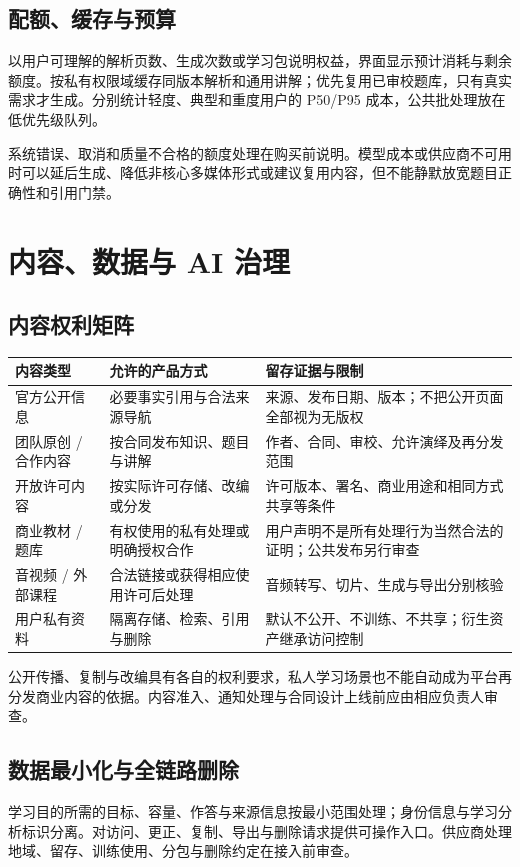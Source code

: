 \documentclass[UTF8,a4paper,11pt,fontset=none]{ctexart}
\newcommand{\cth}[1]{\textbf{\sffamily #1}}
\newcommand{\newsec}[1]{\clearpage\section{#1}}
\newenvironment{tbl}{\par\vspace{3pt}\small\noindent\ignorespaces}{\unskip\par\vspace{5pt}}
\begin{document}
\subsection{配额、缓存与预算}
以用户可理解的解析页数、生成次数或学习包说明权益，界面显示预计消耗与剩余额度。按私有权限域缓存同版本解析和通用讲解；优先复用已审校题库，只有真实需求才生成。分别统计轻度、典型和重度用户的 P50/P95 成本，公共批处理放在低优先级队列。

系统错误、取消和质量不合格的额度处理在购买前说明。模型成本或供应商不可用时可以延后生成、降低非核心多媒体形式或建议复用内容，但不能静默放宽题目正确性和引用门禁。

\newsec{内容、数据与 AI 治理}
\subsection{内容权利矩阵}
\begin{tbl}
\begin{tabularx}{\linewidth}{@{}L{29mm}YY@{}}
\toprule
\cth{内容类型}&\cth{允许的产品方式}&\cth{留存证据与限制}\\\midrule
官方公开信息&必要事实引用与合法来源导航&来源、发布日期、版本；不把公开页面全部视为无版权\\
团队原创 / 合作内容&按合同发布知识、题目与讲解&作者、合同、审校、允许演绎及再分发范围\\
开放许可内容&按实际许可存储、改编或分发&许可版本、署名、商业用途和相同方式共享等条件\\
商业教材 / 题库&有权使用的私有处理或明确授权合作&用户声明不是所有处理行为当然合法的证明；公共发布另行审查\\
音视频 / 外部课程&合法链接或获得相应使用许可后处理&音频转写、切片、生成与导出分别核验\\
用户私有资料&隔离存储、检索、引用与删除&默认不公开、不训练、不共享；衍生资产继承访问控制\\
\bottomrule
\end{tabularx}
\end{tbl}
公开传播、复制与改编具有各自的权利要求，私人学习场景也不能自动成为平台再分发商业内容的依据。内容准入、通知处理与合同设计上线前应由相应负责人审查。\cite{copyright}

\subsection{数据最小化与全链路删除}
学习目的所需的目标、容量、作答与来源信息按最小范围处理；身份信息与学习分析标识分离。对访问、更正、复制、导出与删除请求提供可操作入口。供应商处理地域、留存、训练使用、分包与删除约定在接入前审查。\cite{pipl,datareg}
\end{document}

